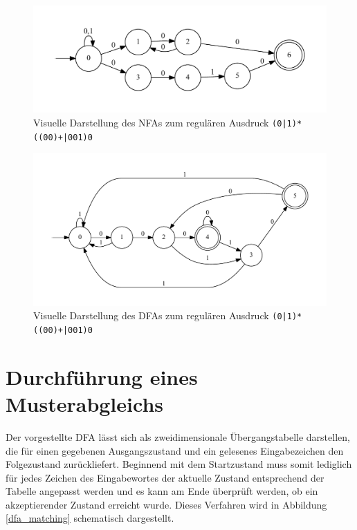 \begin{figure}[ht]
	\includegraphics[width=\textwidth]{bilder/nfa_beispiel.pdf}
	\caption{Visuelle Darstellung des NFAs zum regulären Ausdruck \texttt{(0|1)*((00)+|001)0}}
	\label{nfa_beispiel}
\end{figure}

\begin{figure}[ht]
	\includegraphics[width=\textwidth]{bilder/dfa_beispiel.pdf}
	\caption{Visuelle Darstellung des DFAs zum regulären Ausdruck \texttt{(0|1)*((00)+|001)0}}
	\label{dfa_beispiel}
\end{figure}

\section{Durchführung eines Musterabgleichs}

Der vorgestellte DFA lässt sich als zweidimensionale Übergangstabelle darstellen, die für einen gegebenen Ausgangszustand und ein gelesenes Eingabezeichen den Folgezustand zurückliefert.
Beginnend mit dem Startzustand muss somit lediglich für jedes Zeichen des Eingabewortes der aktuelle Zustand entsprechend der Tabelle angepasst werden und es kann am Ende überprüft werden, ob ein akzeptierender Zustand erreicht wurde.
Dieses Verfahren wird in Abbildung \ref{dfa_matching} schematisch dargestellt.

